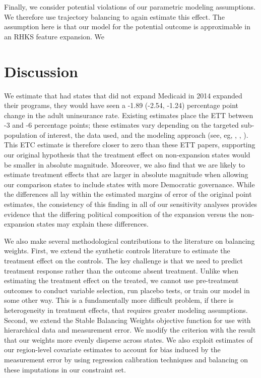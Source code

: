 \documentclass[12pt]{article}
\begin{document}
Finally, we consider potential violations of our parametric modeling assumptions. We therefore use trajectory balancing to again estimate this effect. The assumption here is that our model for the potential outcome is approximable in an RHKS feature expansion. We 

\section{Discussion}

We estimate that had states that did not expand Medicaid in 2014 expanded their programs, they would have seen a -1.89 (-2.54, -1.24) percentage point change in the adult uninsurance rate. Existing estimates place the ETT between -3 and -6 percentage points; these estimates vary depending on the targeted sub-population of interest, the data used, and the modeling approach (see, eg, \cite{courtemanche2017early}, \cite{kaestner2017effects}, \cite{frean2017premium}). This ETC estimate is therefore closer to zero than these ETT papers, supporting our original hypothesis that the treatment effect on non-expansion states would be smaller in absolute magnitude. Moreover, we also find that we are likely to estimate treatment effects that are larger in absolute magnitude when allowing our comparison states to include states with more Democratic governance. While the differences all lay within the estimated margins of error of the original point estimates, the consistency of this finding in all of our sensitivity analyses provides evidence that the differing political composition of the expansion versus the non-expansion states may explain these differences. 

We also make several methodological contributions to the literature on balancing weights. First, we extend the synthetic controls literature to estimate the treatment effect on the controls. The key challenge is that we need to predict treatment response rather than the outcome absent treatment. Unlike when estimating the treatment effect on the treated, we cannot use pre-treatment outcomes to conduct variable selection, run placebo tests, or train our model in some other way. This is a fundamentally more difficult problem, if there is heterogeneity in treatment effects, that requires greater modeling assumptions. Second, we extend the Stable Balancing Weights objective function for use with hierarchical data and measurement error. We modify the criterion with the result that our weights more evenly disperse across states. We also exploit estimates of our region-level covariate estimates to account for bias induced by the measurement error by using regression calibration techniques and balancing on these imputations in our constraint set.
\end{document}
